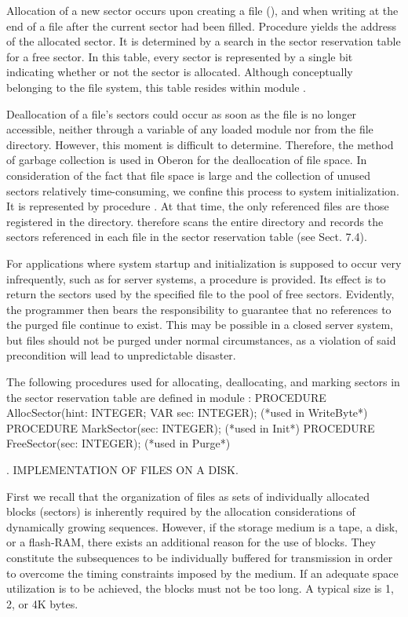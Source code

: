 \noindent Allocation of a new sector occurs upon creating a file (), and when writing at the end of a file after the current sector had been filled. Procedure  yields the address of the allocated sector. It is determined by a search in the sector reservation table for a free sector. In this table, every sector is represented by a single bit indicating whether or not the sector is allocated. Although conceptually belonging to the file system, this table resides within module .

Deallocation of a file's sectors could occur as soon as the file is no longer accessible, neither through a variable of any loaded module nor from the file directory. However, this moment is difficult to determine. Therefore, the method of garbage collection is used in Oberon for the deallocation of file space. In consideration of the fact that file space is large and the collection of unused sectors relatively time-consuming, we confine this process to system initialization. It is represented by procedure . At that time, the only referenced files are those registered in the directory.  therefore scans the entire directory and records the sectors referenced in each file in the sector reservation table (see Sect. 7.4).

For applications where system startup and initialization is supposed to occur very infrequently, such as for server systems, a procedure  is provided. Its effect is to return the sectors used by the specified file to the pool of free sectors. Evidently, the programmer then bears the responsibility to guarantee that no references to the purged file continue to exist. This may be possible in a closed server system, but files should not be purged under normal circumstances, as a violation of said precondition will lead to unpredictable disaster.

The following procedures used for allocating, deallocating, and marking sectors in the sector reservation table are defined in module :
\begintt
PROCEDURE AllocSector(hint: INTEGER; VAR sec: INTEGER); (*used in WriteByte*)
PROCEDURE MarkSector(sec: INTEGER); (*used in Init*)
PROCEDURE FreeSector(sec: INTEGER); (*used in Purge*)
\endtt

. IMPLEMENTATION OF FILES ON A DISK.

First we recall that the organization of files as sets of individually allocated blocks (sectors) is inherently required by the allocation considerations of dynamically growing sequences. However, if the storage medium is a tape, a disk, or a flash-RAM, there exists an additional reason for the use of blocks. They constitute the subsequences to be individually buffered for transmission in order to overcome the timing constraints imposed by the medium. If an adequate space utilization is to be achieved, the blocks must not be too long. A typical size is 1, 2, or 4K bytes.

